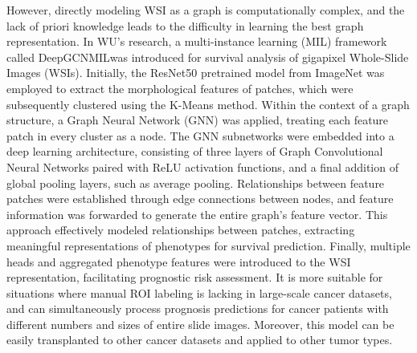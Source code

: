 \documentclass[journal,twoside,web]{ieeecolor}
\begin{document}
However, directly modeling WSI as a graph is computationally complex, and the lack of priori knowledge leads to the difficulty in learning the best graph representation. In WU’s research, a multi-instance learning (MIL) framework called DeepGCNMIL\cite{wu2022deepgcnmil}was introduced for survival analysis of gigapixel Whole-Slide Images (WSIs). Initially, the ResNet50 pretrained model from ImageNet was employed to extract the morphological features of patches, which were subsequently clustered using the K-Means method. Within the context of a graph structure, a Graph Neural Network (GNN) was applied, treating each feature patch in every cluster as a node. The GNN subnetworks were embedded into a deep learning architecture, consisting of three layers of Graph Convolutional Neural Networks paired with ReLU activation functions, and a final addition of global pooling layers, such as average pooling. Relationships between feature patches were established through edge connections between nodes, and feature information was forwarded to generate the entire graph's feature vector. This approach effectively modeled relationships between patches, extracting meaningful representations of phenotypes for survival prediction. Finally, multiple heads and aggregated phenotype features were introduced to the WSI representation, facilitating prognostic risk assessment. It is more suitable for situations where manual ROI labeling is lacking in large-scale cancer datasets, and can simultaneously process prognosis predictions for cancer patients with different numbers and sizes of entire slide images. Moreover, this model can be easily transplanted to other cancer datasets and applied to other tumor types.


\end{document}
